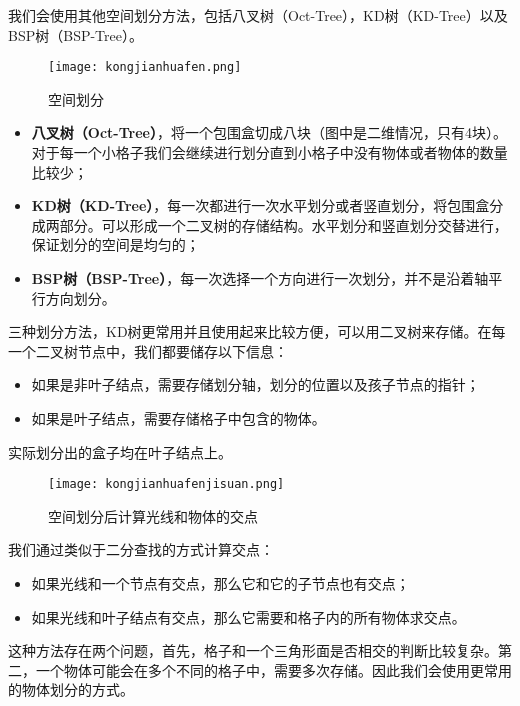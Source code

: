 \documentclass[openany]{progbookcn}
\begin{document}
我们会使用其他空间划分方法，包括八叉树（Oct-Tree），KD树（KD-Tree）以及BSP树（BSP-Tree）。
\begin{figure}[H]
	\centering
	\texttt{[image: kongjianhuafen.png]}
	\caption{空间划分}
	\label{fig:kjhf}
\end{figure}
\begin{itemize}
	\item \textbf{八叉树（Oct-Tree）}，将一个包围盒切成八块（图中是二维情况，只有4块）。对于每一个小格子我们会继续进行划分直到小格子中没有物体或者物体的数量比较少；
	\item \textbf{KD树（KD-Tree）}，每一次都进行一次水平划分或者竖直划分，将包围盒分成两部分。可以形成一个二叉树的存储结构。水平划分和竖直划分交替进行，保证划分的空间是均匀的；
	\item \textbf{BSP树（BSP-Tree）}，每一次选择一个方向进行一次划分，并不是沿着轴平行方向划分。
\end{itemize}
三种划分方法，KD树更常用并且使用起来比较方便，可以用二叉树来存储。在每一个二叉树节点中，我们都要储存以下信息：
\begin{itemize}
	\item 如果是非叶子结点，需要存储划分轴，划分的位置以及孩子节点的指针；
	\item 如果是叶子结点，需要存储格子中包含的物体。
\end{itemize}

实际划分出的盒子均在叶子结点上。

\begin{figure}[H]
	\centering
	\texttt{[image: kongjianhuafenjisuan.png]}
	\caption{空间划分后计算光线和物体的交点}
	\label{fig:kjhfjs}
\end{figure}
我们通过类似于二分查找的方式计算交点：
\begin{itemize}
	\item 如果光线和一个节点有交点，那么它和它的子节点也有交点；
	\item 如果光线和叶子结点有交点，那么它需要和格子内的所有物体求交点。
\end{itemize}
这种方法存在两个问题，首先，格子和一个三角形面是否相交的判断比较复杂。第二，一个物体可能会在多个不同的格子中，需要多次存储。因此我们会使用更常用的物体划分的方式。
\end{document}
